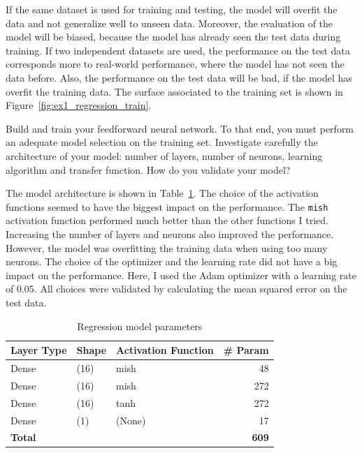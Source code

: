 \documentclass{article}
\newenvironment{task}[1]{
  \begin{tcolorbox}[
    colback=highlight!5!white,
    colframe=highlight,
    title={Task #1}
  ]
}{
  \end{tcolorbox}
}
\begin{document}
If the same dataset is used for training and testing, the model will overfit the data and not
generalize well to unseen data. Moreover, the evaluation of the model will be biased, because the
model has already seen the test data during training. If two independent datasets are used, the
performance on the test data corresponds more to real-world performance, where the model has not
seen the data before. Also, the performance on the test data will be bad, if the model has overfit
the training data. The surface associated to the training set is shown in
Figure~\ref{fig:ex1_regression_train}.


\begin{task}{1.4.2}
  Build and train your feedforward neural network. To that end, you must perform an adequate model
  selection on the training set. Investigate carefully the architecture of your model: number of
  layers, number of neurons, learning algorithm and transfer function. How do you validate your
  model?
\end{task}

The model architecture is shown in Table~\ref{tab:ex1_regression_model}. The choice of the
activation functions seemed to have the biggest impact on the performance. The \texttt{mish}
activation function performed much better than the other functions I tried. Increasing the number of
layers and neurons also improved the performance. However, the model was overfitting the training
data when using too many neurons. The choice of the optimizer and the learning rate did not have a
big impact on the performance. Here, I used the Adam optimizer with a learning rate of $0.05$. All
choices were validated by calculating the mean squared error on the test data.

\begin{table}[ht!]
  \centering
  \begin{tabular}{|l|l|l|r|}
    \hline
    \textbf{Layer Type} & \textbf{Shape} & \textbf{Activation Function} & \textbf{\# Param} \\ \hline
    Dense               & (16)           & mish                         & 48                \\ \hline
    Dense               & (16)           & mish                         & 272               \\ \hline
    Dense               & (16)           & tanh                         & 272               \\ \hline
    Dense               & (1)            & (None)                       & 17                \\ \hline\hline
    \textbf{Total}      &                &                              & \textbf{609}      \\ \hline
  \end{tabular}
  \caption{Regression model parameters}
  \label{tab:ex1_regression_model}
\end{table}
\end{document}
